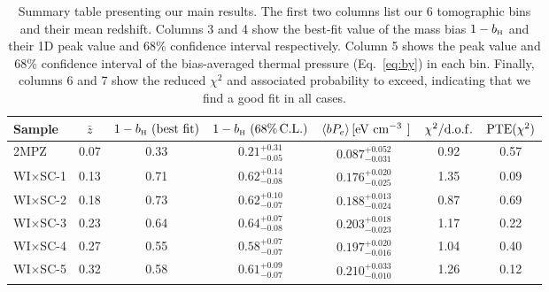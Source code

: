\documentclass[useAMS,usenatbib]{mn2e}
\newcommand{\wisc}{WI$\times$SC}
\def\bH{b_{\scriptscriptstyle\rm H}}
\begin{document}
      \begin{table}
        \begin{center}
          \begin{tabular}{l|cccccc}
            \hline
            Sample & $\bar{z}$ & $1-\bH\,\,({\rm best\,\,fit})$ & $1-\bH\,\,(68\%\,{\rm C.L.})$ & $\langle bP_e\rangle\,[{\rm eV}\,\,{\rm cm}^{-3^{\phantom{2}}}]$ & $\chi^2/{\rm d.o.f.}$ & ${\rm PTE}(\chi^2)$\\[1ex]
            \hline
            2MPZ    & 0.07     & 0.33                         & $0.21^{+0.31}_{-0.05}$      & $0.087^{+0.052^{\phantom{A}}}_{-0.031}$                          & 0.92                  & 0.57               \\
            \wisc-1 & 0.13     & 0.71                         & $0.62^{+0.14}_{-0.08}$      & $0.176^{+0.020^{\phantom{A}}}_{-0.025}$                          & 1.35                  & 0.09               \\
            \wisc-2 & 0.18     & 0.73                         & $0.62^{+0.10}_{-0.07}$      & $0.188^{+0.013^{\phantom{A}}}_{-0.024}$                          & 0.87                  & 0.69               \\
            \wisc-3 & 0.23     & 0.64                         & $0.64^{+0.07}_{-0.08}$      & $0.203^{+0.018^{\phantom{A}}}_{-0.023}$                          & 1.17                  & 0.22               \\
            \wisc-4 & 0.27     & 0.55                         & $0.58^{+0.07}_{-0.07}$      & $0.197^{+0.020^{\phantom{A}}}_{-0.016}$                          & 1.04                  & 0.40               \\
            \wisc-5 & 0.32     & 0.58                         & $0.61^{+0.09}_{-0.07}$      & $0.210^{+0.033^{\phantom{A}}}_{-0.010_{\phantom{A}}}$                          & 1.26                  & 0.12               \\
            \hline
          \end{tabular}
          \caption{Summary table presenting our main results. The first two columns list our 6 tomographic bins and their mean redshift. Columns 3 and 4 show the best-fit value of the mass bias $1-\bH$ and their 1D peak value and 68\% confidence interval respectively. Column 5 shows the peak value and 68\% confidence interval of the bias-averaged thermal pressure (Eq.\!~\ref{eq:by}) in each bin. Finally, columns 6 and 7 show the reduced $\chi^2$ and associated probability to exceed, indicating that we find a good fit in all cases.}\label{tab:results}
        \end{center}
      \end{table}
\end{document}
